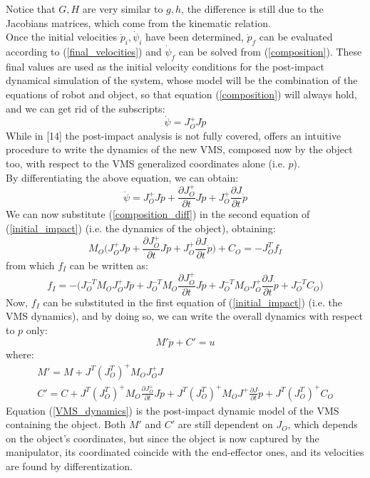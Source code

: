 \documentclass[a4paper,12pt,oneside]{report}
\begin{document}
Notice that $G,H$ are very similar to $g,h$, the difference is still due to the Jacobians matrices, which come from the kinematic relation.\\
Once the initial velocities $\dot{p}_i,\dot{\psi}_i$ have been determined, $\dot{p}_f$ can be evaluated according to (\ref{final_velocities}) and $\dot{\psi}_f$ can be solved from (\ref{composition}). These final values are used as the initial velocity conditions for the post-impact dynamical simulation of the system, whose model will be the combination of the equations of robot and object, so that equation (\ref{composition}) will always hold, and we can get rid of the subscripts:
\begin{equation}
  \dot{\psi}=J_O^+J\dot{p}
\end{equation}
While in [14] the post-impact analysis is not fully covered, \cite{sixteen} offers an intuitive procedure to write the dynamics of the new VMS, composed now by the object too, with respect to the VMS generalized coordinates alone (i.e. $p$).\\ 
By differentiating the above equation, we can obtain:
\begin{equation}
  \ddot{\psi}=J_O^+J\ddot{p}+\frac{\partial J_O^+}{\partial t}J\dot{p}+J_O^+\frac{\partial J}{\partial t}\dot{p}
  \label{composition_diff}
\end{equation}
We can now substitute (\ref{composition_diff}) in the second equation of (\ref{initial_impact}) (i.e. the dynamics of the object), obtaining:
\begin{equation}
  M_O\Big(J_O^+J\ddot{p}+\frac{\partial J_O^+}{\partial t}J\dot{p}+J_O^+\frac{\partial J}{\partial t}\dot{p}\Big)+C_O=-J_O^Tf_I
\end{equation}
from which $f_I$ can be written as:
\begin{equation}
  f_I=-\Big(J_O^{-T}M_OJ_O^+J\ddot{p}+J_O^{-T}M_O\frac{\partial J_O^+}{\partial t}J\dot{p}+J_O^{-T}M_OJ_O^+\frac{\partial J}{\partial t}\dot{p}+J_O^{-T}C_O\Big)
\end{equation}
Now, $f_I$ can be substituted in the first equation of (\ref{initial_impact}) (i.e. the VMS dynamics), and by doing so, we can write the overall dynamics with respect to $p$ only:
\begin{equation}
  M'\ddot{p}+C'=u
  \label{final_equation_motion}
\end{equation}
where:
\begin{equation}
  \begin{array}{l}
    M'=M+J^T(J_O^T)^+M_OJ_O^+J\\
    C'=C+J^T(J_O^T)^+M_O\frac{\partial J_O^+}{\partial t}J\dot{p}+J^T(J_O^T)^+M_OJ^+\frac{\partial J}{\partial t}\dot{p}+J^T(J_O^T)^+C_O
  \end{array}
  \label{VMS_dynamics}
\end{equation}
Equation (\ref{VMS_dynamics}) is the post-impact dynamic model of the VMS containing the object. Both $M'$ and $C'$ are still dependent on $J_O$, which depends on the object's coordinates, but since the object is now captured by the manipulator, its coordinated coincide with the end-effector ones, and its velocities are found by differentization.
\newpage
\FloatBarrier
\end{document}
